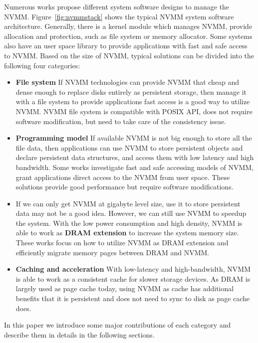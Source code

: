 Numerous works propose different system software designs to
manage the NVMM. Figure~\ref{fig:nvmmstack} shows the typical NVMM system
software architecture. Generally, there is a kernel module which manages
NVMM, provide allocation and protection, such as file system or memory
allocator. Some systems also have an user space library to provide applications
with fast and safe access to NVMM.
Based on the size of NVMM, typical solutions can be divided into
the following four categories:

\begin{itemize}
\item \textbf{File system} If NVMM technologies can provide NVMM
that cheap and dense enough to replace disks entirely as persistent storage,
then manage it with a file system to provide applications
fast access is a good way to utilize NVMM. NVMM file system is compatible
with POSIX API, does not require software modification, but need to take care
of the consistency issue.

\item \textbf{Programming model} If available NVMM is not big enough to store
all the file data, then applications can use NVMM to store persistent objects
and declare persistent
data structures, and access them with low latency and high bandwidth.
Some works investigate fast and safe accessing models of
NVMM, grant applications direct access to the NVMM from user space. 
These solutions provide good performance but require software modifications.

\item If we can only get NVMM at gigabyte level size,
use it to store persistent data may not be a good idea. However, we can still
use NVMM to speedup the system. With the low power consumption and high density,
NVMM is able to work as \textbf{ DRAM extension} to increase the system memory
size. These
works focus on how to utilize NVMM as DRAM extension and efficiently
migrate memory pages between DRAM and NVMM.

\item \textbf{Caching and acceleration} With low-latency and high-bandwidth,
NVMM is able to work as a consistent cache for slower storage devices. As
DRAM is largely used as page cache today, using NVMM as cache has additional
benefits that it is persistent and does not need to sync to disk as page cache
does.

\end{itemize}  

In this paper we introduce some major contributions of each category
and describe them in details in the following sections.

